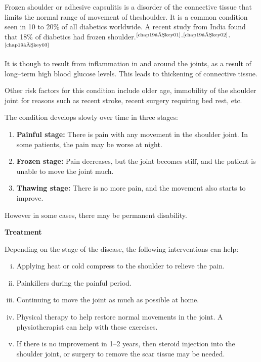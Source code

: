 
\vskip 6pt
Frozen shoulder or adhesive capsulitis is a disorder of the conne\-ctive tissue that limits the normal range of movement of the\break shoulder. It is a common condition seen in 10 to 20\% of all diabetics worldwide. A recent study from India found that 18\% of diabetics had frozen shoulder.$^{\text{\cite{chap19–key01}}}$$^,$$^{\text{\cite{chap19–key02}}}$$^,$$^{\text{\cite{chap19–key03}}}$


It is though to result from inflammation in and around the joints, as a result of long–term high blood glucose levels. This leads to thicke\-ning of connective tissue.


Other risk factors for this condition include older age, immobility of the shoulder joint for reasons such as recent stroke, recent surgery requiring bed rest, etc.

\vskip 5pt
\noindent The condition develops slowly over time in three stages:

\begin{enumerate}
\itemsep=0pt
\item \textbf{Painful stage:} There is pain with any movement in the shoulder joint. In some patients, the pain may be worse at night.
\item \textbf{Frozen stage:} Pain decreases, but the joint becomes stiff, and the patient is unable to move the joint much.
\item \textbf{Thawing stage:} There is no more pain, and the movement also starts to improve.
\end{enumerate}


\noindent However in some cases, there may be permanent disability.

\clearpage
\noindent\textbf{Treatment}

\noindent Depending on the stage of the disease, the following interventions can help:

\begin{enumerate}[i.]
\itemsep=0pt
\item Applying heat or cold compress to the shoulder to relieve the pain.
\item Painkillers during the painful period.
\item Continuing to move the joint as much as possible at home.
\item Physical therapy to help restore normal movements in the joint. A physiotherapist can help with these exercises.
\item If there is no improvement in 1–2 years, then steroid injection into the shoulder joint, or surgery to remove the scar tissue may be needed.
\end{enumerate}

